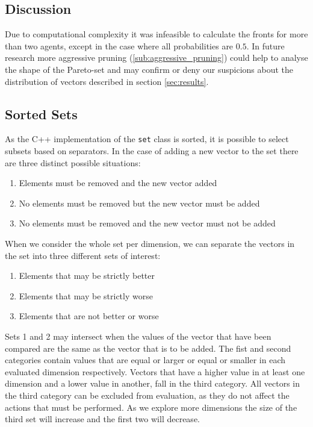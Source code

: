 \documentclass{article}
\begin{document}
	\begin{multicols}{2}
	\section{Discussion}
	\label{sec:discussion}
	Due to computational complexity it was infeasible to calculate the fronts
	for more than two agents, except in the case where all probabilities are
	$0.5$. In future research more aggressive pruning
	(\ref{sub:aggressive_pruning}) could help to analyse the shape of the
	Pareto-set and may confirm or deny our suspicions about the distribution of
	vectors described in section \ref{sec:results}.
	\subsection{Sorted Sets}
		\label{sub:sorted_sets}
		As the C++ implementation of the \texttt{set} class is sorted, it is
		possible to select subsets based on separators. In the case of adding a
		new vector to the set there are three distinct possible situations:
		\begin{enumerate}
			\item Elements must be removed and the new vector added
			\item No elements must be removed but the new vector must be added
			\item No elements must be removed and the new vector must not be added
		\end{enumerate}
		When we consider the whole set per dimension, we can separate the vectors
		in the set into three different sets of interest:
		\begin{enumerate}
			\item Elements that may be strictly better
			\item Elements that may be strictly worse
			\item Elements that are not better or worse
		\end{enumerate}
		Sets 1 and 2 may intersect when the values of the vector that have been
		compared are the same as the vector that is to be added.  The fist and
		second categories contain values that are equal or larger or equal or
		smaller in each evaluated dimension respectively.  Vectors that have a
		higher value in at least one dimension and a lower value in another, fall
		in the third category. All vectors in the third category can be excluded
		from evaluation, as they do not affect the actions that must be
		performed. As we explore more dimensions the size of the third set will
		increase and the first two will decrease.


\end{multicols}
\end{document}

